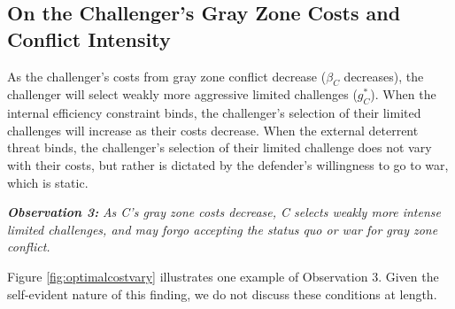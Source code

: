 \documentclass[11pt,letterpaper,pdftex,dvipsnames,table]{article}
\begin{document}
\subsection{On the Challenger's Gray Zone Costs and Conflict Intensity}
As the challenger's costs from gray zone conflict decrease ($\beta_{C}$ decreases), the challenger will select weakly more aggressive limited challenges ($g_{C}^{*}$). When the internal efficiency constraint binds, the challenger's selection of their limited challenges will increase as their costs decrease. When the external deterrent threat binds, the challenger's selection of their limited challenge does not vary with their costs, but rather is dictated by the defender's willingness to go to war, which is static.

\textbf{\textit{Observation 3:}}\textit{ As C's gray zone costs decrease, C selects weakly more intense limited challenges, and may forgo accepting the status quo or war for gray zone conflict.}
 
Figure \ref{fig:optimalcostvary} illustrates one example of Observation 3. Given the self-evident nature of this finding, we do not discuss these conditions at length.
\end{document}
